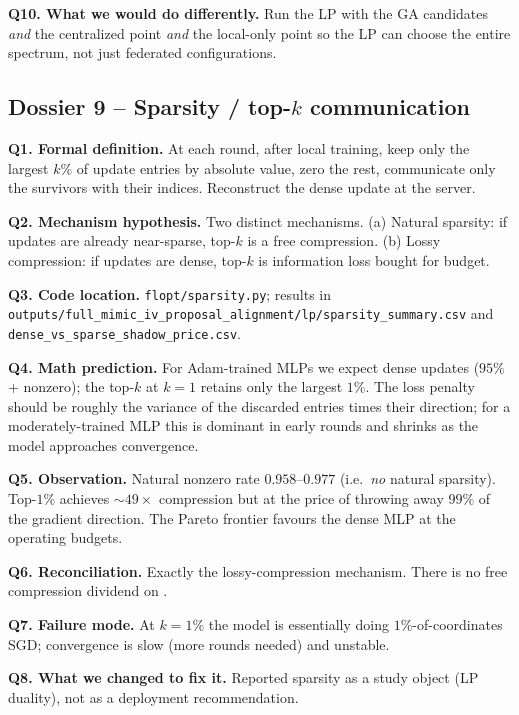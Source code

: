 \textbf{Q10. What we would do differently.}
Run the LP with the GA candidates \emph{and} the centralized point
\emph{and} the local-only point so the LP can choose the entire
spectrum, not just federated configurations.

\subsection{Dossier 9 -- Sparsity / top-$k$ communication}
\label{sec:dossier-sparsity}

\textbf{Q1. Formal definition.}
At each round, after local training, keep only the largest $k\%$ of
update entries by absolute value, zero the rest, communicate only the
survivors with their indices. Reconstruct the dense update at the
server.

\textbf{Q2. Mechanism hypothesis.}
Two distinct mechanisms. (a) Natural sparsity: if updates are already
near-sparse, top-$k$ is a free compression. (b) Lossy compression: if
updates are dense, top-$k$ is information loss bought for budget.

\textbf{Q3. Code location.}
\texttt{flopt/sparsity.py}; results in
\texttt{outputs/full\_mimic\_iv\_proposal\_alignment/lp/sparsity\_summary.csv}
and \texttt{dense\_vs\_sparse\_shadow\_price.csv}.

\textbf{Q4. Math prediction.}
For Adam-trained MLPs we expect dense updates ($95\%$+ nonzero); the
top-$k$ at $k\!=\!1$ retains only the largest $1\%$. The loss penalty
should be roughly the variance of the discarded entries times their
direction; for a moderately-trained MLP this is dominant in early
rounds and shrinks as the model approaches convergence.

\textbf{Q5. Observation.}
Natural nonzero rate $0.958$--$0.977$ (i.e.\ \emph{no} natural
sparsity). Top-$1\%$ achieves $\sim$$49\!\times$ compression but at
the price of throwing away $99\%$ of the gradient direction. The
Pareto frontier favours the dense MLP at the operating budgets.

\textbf{Q6. Reconciliation.}
Exactly the lossy-compression mechanism. There is no free
compression dividend on \mimic{}.

\textbf{Q7. Failure mode.}
At $k\!=\!1\%$ the model is essentially doing $1\%$-of-coordinates
SGD; convergence is slow (more rounds needed) and unstable.

\textbf{Q8. What we changed to fix it.}
Reported sparsity as a study object (LP duality), not as a deployment
recommendation.

